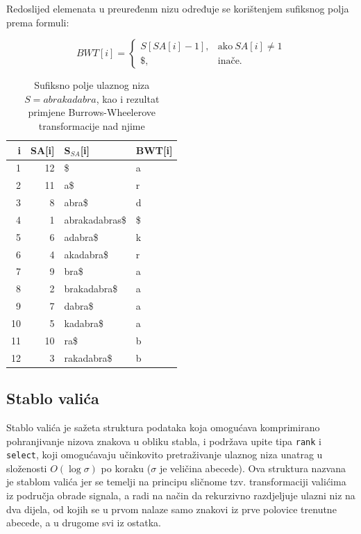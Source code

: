 \documentclass[a4paper,12pt]{article}
\begin{document}
Redoslijed elemenata u preuređenm nizu određuje se korištenjem sufiksnog polja prema formuli:

$$
BWT[i]=
\begin{cases}
S[SA[i]-1], & \text{ako} \  SA[i]\neq 1\\
\$, & \text{inače}.
\end{cases}
$$

\begin{table}[h!]
	\caption{Sufiksno polje ulaznog niza $S = abrakadabra$, kao i rezultat primjene Burrows-Wheelerove transformacije nad njime}
	\label{tablePrimjer2}
	\begin{center}
		\begin{tabular}{rrll}
			\toprule
			i & SA[i] & S$_{SA}$[i] & BWT[i] \\
			\midrule
			1 & 12 & \$ & a\\
			2 & 11 &  a\$ & r \\
			3 & 8 & abra\$ & d \\
			4 & 1 & abrakadabras\$ & \$ \\
			5 & 6 & adabra\$ & k \\
			6 & 4 & akadabra\$ & r \\
			7 & 9 & bra\$ & a\\
			8 & 2 & brakadabra\$ & a\\
			9 & 7 & dabra\$ & a \\
			10 & 5 & kadabra\$ & a\\
			11 & 10 & ra\$ & b \\
			12 & 3 & rakadabra\$ & b\\
			\bottomrule
		\end{tabular}
	\end{center}
\end{table}

\newpage

\subsection{Stablo valića}
Stablo valića je sažeta struktura podataka koja omogućava komprimirano pohranjivanje nizova znakova u obliku stabla, i podržava upite tipa \texttt{rank} i \texttt{select}, koji omogućavaju učinkovito pretraživanje ulaznog niza unatrag u složenosti $O(\log\sigma)$ po koraku ($\sigma$ je veličina abecede). Ova struktura nazvana je stablom valića jer se temelji na principu sličnome tzv. transformaciji valićima iz područja obrade signala, a radi na način da rekurzivno razdjeljuje ulazni niz na dva dijela, od kojih se u prvom nalaze samo znakovi iz prve polovice trenutne abecede, a u drugome svi iz ostatka.
\end{document}
